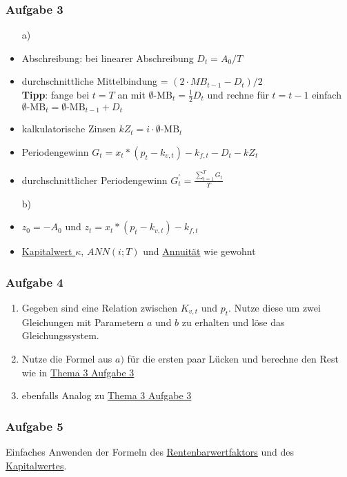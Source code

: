 		\subsubsection*{Aufgabe 3} \label{Thema3Aufgabe3}
		\begin{itemize}
			\item[a)]
			\item Abschreibung: bei linearer Abschreibung $D_t=A_0/T$
			\item durchschnittliche Mittelbindung = $(2\cdot MB_{t-1}-D_t)/2$ \\
			\textbf{Tipp}: fange bei $t=T$ an mit $\emptyset\text{-MB}_{t}=\frac{1}{2}D_t$ und rechne für $t=t-1$ einfach $\emptyset\text{-MB}_{t}=\emptyset\text{-MB}_{t-1}+D_t$
			\item kalkulatorische Zinsen $kZ_t=i\cdot \emptyset\text{-MB}_t$
			\item Periodengewinn $G_t=x_t*(p_t-k_{v,t})-k_{f,t}-D_t-kZ_t$
			\item durchschnittlicher Periodengewinn $G_t^\prime=\frac{\sum_{t=1}^T G_t}{T}$
			\item[b)]
			\item $z_0=-A_0$ und $z_t=x_t*(p_t-k_{v,t})-k_{f,t}$
			\item \hyperref[Kapitalwert]{Kapitalwert $\kappa$}, \hyperref[Annuitaet]{$ANN(i;T)$} und \hyperref[Annuitaet]{Annuität} wie gewohnt
		\end{itemize}
	
		\subsubsection*{Aufgabe 4}
		\begin{enumerate}[label=\alph*)]
			\item Gegeben sind eine Relation zwischen $K_{v,t}$ und $p_t$. Nutze diese um zwei Gleichungen mit Parametern $a$ und $b$ zu erhalten und löse das Gleichungssystem.
			\item Nutze die Formel aus $a)$ für die ersten paar Lücken und berechne den Rest wie in \hyperref[Thema3Aufgabe3]{Thema 3 Aufgabe 3}
			\item ebenfalls Analog zu \hyperref[Thema3Aufgabe3]{Thema 3 Aufgabe 3}
		\end{enumerate}
	
		\subsubsection*{Aufgabe 5}
		Einfaches Anwenden der Formeln des \hyperref[Rentenbarwertfaktor]{Rentenbarwertfaktors} und des \hyperref[Kapitalwert]{Kapitalwertes}.
		
